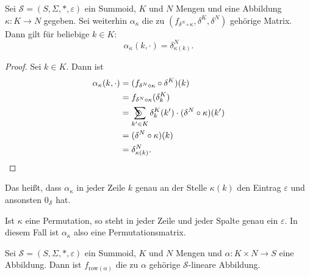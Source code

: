 \documentclass{article}
\DeclareMathOperator*{\sumcirc}{%
  \ThisStyle{\mathop{\ensurestackMath{\stackinset{c}{-1.5\LMpt}{c}{}{%
  \rotatebox[origin=lb]{-90}{$\SavedStyle\scalerel*{\bm\Circle}{%
  i}$}}{\SavedStyle\sum}}}}}
\begin{document}
\begin{theorem}
  Sei $\mathcal{S} = (S, \Sigma, \ast, \varepsilon)$ ein Summoid,
  $K$ und $N$ Mengen und eine Abbildung $\kappa \colon K \to N$ gegeben.
  Sei weiterhin $\alpha_\kappa$ die zu $(f_{\delta^N \circ \kappa}, \delta^K, \delta^N)$
  gehörige Matrix.
  Dann gilt für beliebige $k \in K$:
  \begin{equation*}
    \alpha_\kappa(k, \cdot) = \delta^N_{\kappa(k)}.
  \end{equation*}
\end{theorem}
\begin{proof}
  Sei $k \in K$. Dann ist
  \begin{align*}
    \alpha_\kappa(k, \cdot)
    &= (f_{\delta^N \circ \kappa} \circ \delta^K)(k) \\
    &= f_{\delta^N \circ \kappa}(\delta^K_k) \\
    &= \sumcirc_{k' \in K}\delta^K_k(k') \cdot (\delta^N \circ \kappa)(k') \\
    &= (\delta^N \circ \kappa)(k) \\
    &= \delta^N_{\kappa(k)}.
  \end{align*}
\end{proof}

\begin{remark}
  Das heißt, dass $\alpha_\kappa$ in jeder Zeile $k$ genau an der Stelle $\kappa(k)$
  den Eintrag $\varepsilon$ und ansonsten $0_\mathcal{S}$ hat.

  Ist $\kappa$ eine Permutation, so steht in jeder Zeile und jeder Spalte genau ein $\varepsilon$.
  In diesem Fall ist $\alpha_\kappa$ also eine Permutationsmatrix.
\end{remark}

\begin{definition}
  Sei $\mathcal{S} = (S, \Sigma, \ast, \varepsilon)$ ein Summoid, $K$ und $N$ Mengen und
  $\alpha \colon K \times N \to S$ eine Abbildung.
  Dann ist $f_{\text{row}(\alpha)}$ die zu $\alpha$ gehörige $\mathcal{S}$-lineare Abbildung.
\end{definition}
\end{document}
